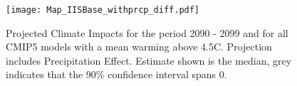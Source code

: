 \documentclass[11pt, letterpaper]{article}
\numberwithin{algorithm}{section}
\numberwithin{assumption}{section}
\numberwithin{lemma}{section}
\numberwithin{theorem}{section}
\numberwithin{corollary}{section}
\numberwithin{remark}{section}
\numberwithin{equation}{section}
\numberwithin{figure}{section}
\numberwithin{table}{section}
\begin{document}
\begin{figure}[!htbp]  \vspace{-.35in}
\centering
\texttt{[image: Map\_IISBase\_withprcp\_diff.pdf]}
\caption{Projected Climate Impacts for the period 2090 - 2099 and for all CMIP5 models with a mean warming above 4.5\textdegree C. Projection includes Precipitation Effect. Estimate shown is the median, grey indicates that the 90\% confidence interval spans 0.}
\label{fig_projection_map_withprcp}
\end{figure}
\end{document}
